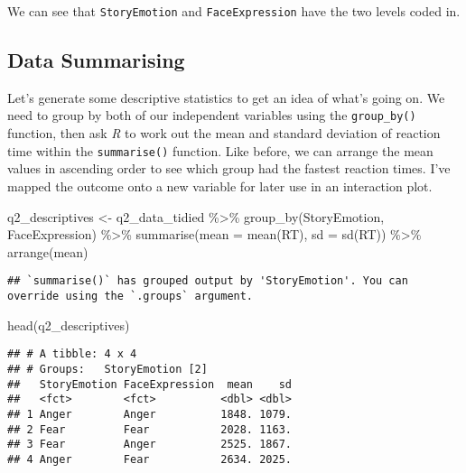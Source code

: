 \documentclass[
]{article}
\newenvironment{Shaded}{\begin{snugshade}}{\end{snugshade}}
\newcommand{\AttributeTok}[1]{\textcolor[rgb]{0.77,0.63,0.00}{#1}}
\newcommand{\FunctionTok}[1]{\textcolor[rgb]{0.00,0.00,0.00}{#1}}
\newcommand{\NormalTok}[1]{#1}
\newcommand{\OtherTok}[1]{\textcolor[rgb]{0.56,0.35,0.01}{#1}}
\newcommand{\SpecialCharTok}[1]{\textcolor[rgb]{0.00,0.00,0.00}{#1}}
\begin{document}
We can see that \texttt{StoryEmotion} and \texttt{FaceExpression} have
the two levels coded in.

\hypertarget{data-summarising-1}{%
\subsection{Data Summarising}\label{data-summarising-1}}

Let's generate some descriptive statistics to get an idea of what's
going on. We need to group by both of our independent variables using
the \texttt{group\_by()} function, then ask \emph{R} to work out the
mean and standard deviation of reaction time within the
\texttt{summarise()} function. Like before, we can arrange the mean
values in ascending order to see which group had the fastest reaction
times. I've mapped the outcome onto a new variable for later use in an
interaction plot.

\begin{Shaded}
\begin{Highlighting}[]
\NormalTok{q2\_descriptives }\OtherTok{\textless{}{-}}\NormalTok{ q2\_data\_tidied }\SpecialCharTok{\%\textgreater{}\%} 
  \FunctionTok{group\_by}\NormalTok{(StoryEmotion, FaceExpression) }\SpecialCharTok{\%\textgreater{}\%} 
  \FunctionTok{summarise}\NormalTok{(}\AttributeTok{mean =} \FunctionTok{mean}\NormalTok{(RT), }\AttributeTok{sd =} \FunctionTok{sd}\NormalTok{(RT)) }\SpecialCharTok{\%\textgreater{}\%} 
  \FunctionTok{arrange}\NormalTok{(mean)}
\end{Highlighting}
\end{Shaded}

\begin{verbatim}
## `summarise()` has grouped output by 'StoryEmotion'. You can override using the `.groups` argument.
\end{verbatim}

\begin{Shaded}
\begin{Highlighting}[]
\FunctionTok{head}\NormalTok{(q2\_descriptives)}
\end{Highlighting}
\end{Shaded}

\begin{verbatim}
## # A tibble: 4 x 4
## # Groups:   StoryEmotion [2]
##   StoryEmotion FaceExpression  mean    sd
##   <fct>        <fct>          <dbl> <dbl>
## 1 Anger        Anger          1848. 1079.
## 2 Fear         Fear           2028. 1163.
## 3 Fear         Anger          2525. 1867.
## 4 Anger        Fear           2634. 2025.
\end{verbatim}
\end{document}
